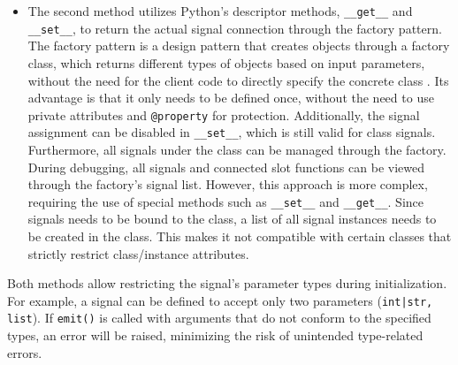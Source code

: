 \documentclass[
	english,
	ruledheaders=section,%
	class=report,%
	thesis={type=Report},%
	accentcolor=9c,%
	custommargins=true,%
	marginpar=false,%
	parskip=half-,%
	fontsize=11pt,%
	logofile={img/tuda_logo.pdf}, %
]{tudapub}
\begin{document}
\begin{itemize}
    \item The second method utilizes Python’s descriptor methods, \texttt{\_\_get\_\_} and \texttt{\_\_set\_\_}, to return the actual signal connection through the factory pattern. The factory pattern is a design pattern that creates objects through a factory class, which returns different types of objects based on input parameters, without the need for the client code to directly specify the concrete class \cite{DesignPatterns}. Its advantage is that it only needs to be defined once, without the need to use private attributes and \texttt{@property} for protection. Additionally, the signal assignment can be disabled in \texttt{\_\_set\_\_}, which is still valid for class signals. Furthermore, all signals under the class can be managed through the factory. During debugging, all signals and connected slot functions can be viewed through the factory's signal list. However, this approach is more complex, requiring the use of special methods such as \texttt{\_\_set\_\_} and \texttt{\_\_get\_\_}. Since signals needs to be bound to the class, a list of all signal instances needs to be created in the class. This makes it not compatible with certain classes that strictly restrict class/instance attributes.
    
\end{itemize}

Both methods allow restricting the signal’s parameter types during initialization. For example, a signal can be defined to accept only two parameters (\texttt{int|str, list}). If \texttt{emit()} is called with arguments that do not conform to the specified types, an error will be raised, minimizing the risk of unintended type-related errors.

\end{document}
